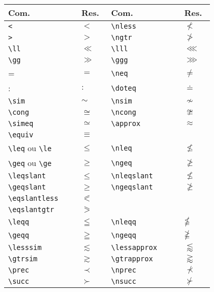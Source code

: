 % 
% 
% 
% 
% 
\begin{tabular}{>{\centering}p{0.3\linewidth}<{\centering}>{\centering}p{0.1\linewidth}<{\centering}|>{\centering}p{0.3\linewidth}<{\centering}>{\centering}p{0.1\linewidth}<{\centering}|}
    \hline
    Com. & Res. & Com. & Res. \tabularnewline \hline
    \lstinline!<! & $<$ & \lstinline!\nless! & $\nless$ \tabularnewline
    \lstinline!>! & $>$ & \lstinline!\ngtr! & $\ngtr$ \tabularnewline 
    \lstinline!\ll! & $\ll$ & \lstinline!\lll! & $\lll$ \tabularnewline
 \lstinline!\gg! & $\gg$ & \lstinline!\ggg! & $\ggg$ \tabularnewline 
    = & $=$ & \lstinline!\neq! & $\neq$ \tabularnewline
 : & $:$ &  \lstinline!\doteq! & $\doteq$  \tabularnewline 
    \lstinline!\sim! & $\sim$ & \lstinline!\nsim! & $\nsim$ \tabularnewline
 \lstinline!\cong! & $\cong$ &  \lstinline!\ncong! & $\ncong$  \tabularnewline 
    \lstinline!\simeq! & $\simeq$ & \lstinline!\approx! & $\approx$ \tabularnewline
  \lstinline!\equiv! & $\equiv$ & & \tabularnewline
    \lstinline!\leq! ou \lstinline!\le! & $\leq$ & \lstinline!\nleq! & $\nleq$ \tabularnewline
 \lstinline!\geq! ou \lstinline!\ge! & $\geq$ & \lstinline!\ngeq! & $\ngeq$ \tabularnewline 
    \lstinline!\leqslant! & $\leqslant$ &  \lstinline!\nleqslant! & $\nleqslant$  \tabularnewline
 \lstinline!\geqslant! & $\geqslant$ & \lstinline!\ngeqslant! & $\ngeqslant$ \tabularnewline 
    \lstinline!\eqslantless!  & $\eqslantless$  &  &  \tabularnewline
 \lstinline!\eqslantgtr! & $\eqslantgtr$ &  &  \tabularnewline 
    \lstinline!\leqq! & $\leqq$ & \lstinline!\nleqq! & $\nleqq$ \tabularnewline
 \lstinline!\geqq! & $\geqq$ & \lstinline!\ngeqq! & $\ngeqq$ \tabularnewline 
    \lstinline!\lesssim!  & $\lesssim$  & \lstinline!\lessapprox!  & $\lessapprox$ \tabularnewline
 \lstinline!\gtrsim! & $\gtrsim$ & \lstinline!\gtrapprox! & $\gtrapprox$ \tabularnewline 
    \lstinline!\prec! & $\prec$ & \lstinline!\nprec! & $\nprec$ \tabularnewline
 \lstinline!\succ! & $\succ$ & \lstinline!\nsucc! & $\nsucc$ \tabularnewline 

\end{tabular}
